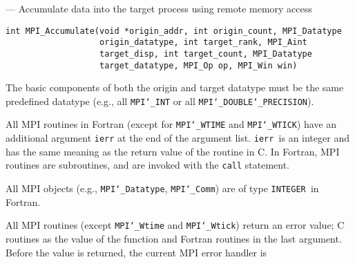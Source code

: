 \startmanpage
{}
--- Accumulate data into the target process using remote  memory access  
\startvb\begin{verbatim}
int MPI_Accumulate(void *origin_addr, int origin_count, MPI_Datatype
                   origin_datatype, int target_rank, MPI_Aint
                   target_disp, int target_count, MPI_Datatype
                   target_datatype, MPI_Op op, MPI_Win win) 

\end{verbatim}
\endvb

\par
{}
The basic components of both the origin and target datatype must be the same
predefined datatype (e.g., all {\tt MPI{\tt \char`\_}INT} or all {\tt MPI{\tt \char`\_}DOUBLE{\tt \char`\_}PRECISION}).
\par
{}
All MPI routines in Fortran (except for {\tt MPI{\tt \char`\_}WTIME} and {\tt MPI{\tt \char`\_}WTICK}) have
an additional argument {\tt ierr} at the end of the argument list.  {\tt ierr
}is an integer and has the same meaning as the return value of the routine
in C.  In Fortran, MPI routines are subroutines, and are invoked with the
{\tt call} statement.
\par
All MPI objects (e.g., {\tt MPI{\tt \char`\_}Datatype}, {\tt MPI{\tt \char`\_}Comm}) are of type {\tt INTEGER
}in Fortran.
\par
{}
\par
All MPI routines (except {\tt MPI{\tt \char`\_}Wtime} and {\tt MPI{\tt \char`\_}Wtick}) return an error value;
C routines as the value of the function and Fortran routines in the last
argument.  Before the value is returned, the current MPI error handler is
